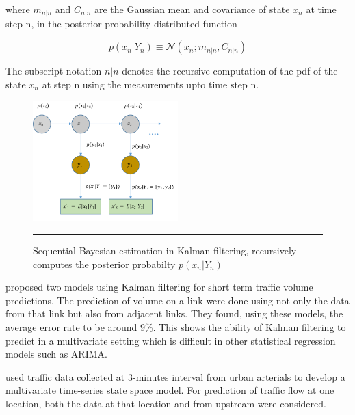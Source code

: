 where $m_{n|n}$ and $C_{n|n}$ are the Gaussian mean and covariance of state $x_{n}$ at time step n,
in the posterior probability distributed function

        \begin{equation} p(x_{n}|Y_{n}) \equiv \mathcal{N}(x_{n};m_{n|n},C_{n|n}) \end{equation}

The subscript notation $n|n$ denotes the recursive computation of the pdf of the state $x_{n}$ at
step n using the measurements upto time step n.

\begin{figure}[htbp]
  \centering
    \includegraphics[width=0.5\textwidth,height=0.5\textheight,keepaspectratio]{Figures/kalman-filter.pdf}
    \rule{35em}{0.5pt}
  \caption[Sequential Bayesian estimation in Kalman filtering]{Sequential Bayesian estimation in
  Kalman filtering, recursively computes the posterior probabilty $p(x_{n}|Y_{n})$}
  \label{fig:kalman-filter}
\end{figure}

\citet{okutani1984dynamic} proposed two models using Kalman filtering for short term traffic volume
predictions. The prediction of volume on a link were done using not only the data from that link but
also from adjacent links. They found, using these models, the average error rate to be around 9\%.
This shows the ability of Kalman filtering to predict in a multivariate setting which is difficult in
other statistical regression models such as ARIMA.

\citet{stathopoulos2003multivariate} used traffic data collected at 3-minutes interval from urban
arterials to develop a multivariate time-series state space model. For prediction of traffic flow at
one location, both the data at that location and from upstream were considered.

\citet{xie2007short}

\citet{guo2010real}

\citet{guo2014adaptive}

